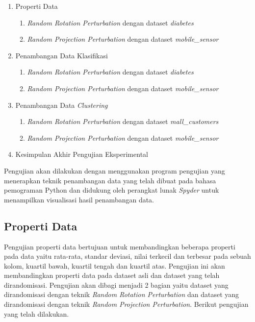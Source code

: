 \begin{enumerate}
	\item Properti Data
	\begin{enumerate}
		\item \textit{Random Rotation Perturbation} dengan dataset \textit{diabetes}
		\item \textit{Random Projection Perturbation} dengan dataset \textit{mobile\_sensor}
	\end{enumerate}
	\item Penambangan Data Klasifikasi
	\begin{enumerate}
		\item \textit{Random Rotation Perturbation} dengan dataset \textit{diabetes}
		\item \textit{Random Projection Perturbation} dengan dataset \textit{mobile\_sensor}
	\end{enumerate}
	\item Penambangan Data \textit{Clustering}
	\begin{enumerate}
		\item \textit{Random Rotation Perturbation} dengan dataset \textit{mall\_customers}
		\item \textit{Random Projection Perturbation} dengan dataset \textit{mobile\_sensor}
	\end{enumerate}
	\item Kesimpulan Akhir Pengujian Eksperimental
\end{enumerate}

Pengujian akan dilakukan dengan menggunakan program pengujian yang menerapkan teknik penambangan data yang telah dibuat pada bahasa pemograman Python dan didukung oleh perangkat lunak \textit{Spyder} untuk menampilkan visualisasi hasil penambangan data.

\subsection{Properti Data}
\label{subsec:pengujian-properti}

Pengujian properti data bertujuan untuk membandingkan beberapa properti pada data yaitu rata-rata, standar deviasi, nilai terkecil dan terbesar pada sebuah kolom, kuartil bawah, kuartil tengah dan kuartil atas. Pengujian ini akan membandingkan properti data pada dataset asli dan dataset yang telah dirandomisasi. Pengujian akan dibagi menjadi 2 bagian yaitu dataset yang dirandomisasi dengan teknik \textit{Random Rotation Perturbation} dan dataset yang dirandomisasi dengan teknik \textit{Random Projection Perturbation}. Berikut pengujian yang telah dilakukan.

